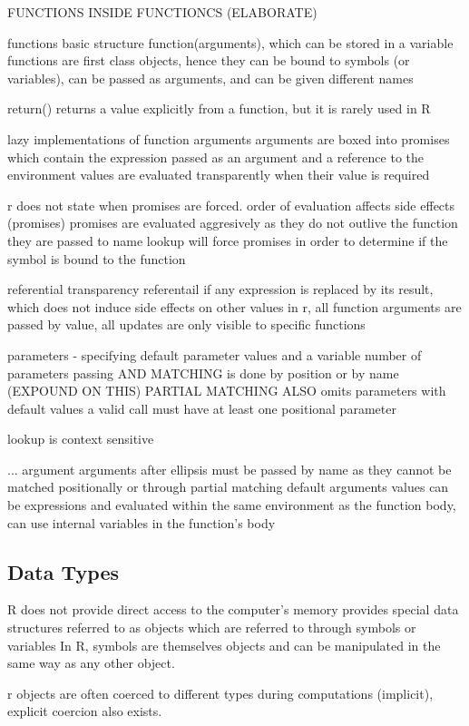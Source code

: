 \documentclass[12pt]{article}
\begin{document}
 FUNCTIONS INSIDE FUNCTIONCS (ELABORATE)

functions
basic structure
function(arguments), which can be stored in a variable
functions are first class objects, hence they can be bound to symbols (or variables), can be passed as arguments, and can be given different names

return() returns a value explicitly from a function, but it is rarely used in R

lazy implementations of function arguments
arguments are boxed into promises which contain the expression passed as an argument and a reference to the environment
values are evaluated transparently when their value is required

r does not state when promises are forced.
order of evaluation affects side effects (promises)
promises are evaluated aggresively as they do not outlive the function they are passed to
name lookup will force promises in order to determine if the symbol is bound to the function

referential transparency
referentail if any expression is replaced by its result, which does not induce side effects on other values
in r, all function arguments are passed by value, all updates are only visible to specific functions

parameters - specifying default parameter values and a variable number of parameters
passing AND MATCHING is done by position or by name (EXPOUND ON THIS)
PARTIAL MATCHING ALSO
omits parameters with default values
a valid call must have at least one positional parameter

lookup is context sensitive

... argument
arguments after ellipsis must be passed by name as they cannot be matched positionally or through partial matching
default arguments values can be expressions and evaluated within the same environment as the function body, can use internal variables in the function's body

\iffalse
\subsection{Data Types}
R does not provide direct access to the computer's memory
provides special data structures referred to as objects
which are referred to through symbols or variables
In R, symbols are themselves objects and can be manipulated in the same way as any other object.

r objects are often coerced to different types during computations (implicit), explicit coercion also exists.
\end{document}
